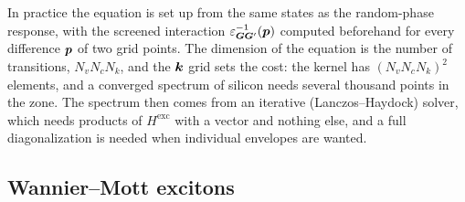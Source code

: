 In practice the equation is set up from the same states as the random-phase response, with the screened interaction $\varepsilon^{-1}_{\bm{G}\bm{G}'}(\bm{p})$ computed beforehand for every difference $\bm{p}$ of two grid points. The dimension of the equation is the number of transitions, $N_vN_cN_k$, and the $\bm{k}$ grid sets the cost: the kernel has $(N_vN_cN_k)^2$ elements, and a converged spectrum of silicon needs several thousand points in the zone. The spectrum then comes from an iterative (Lanczos--Haydock) solver, which needs products of $H^{\mathrm{exc}}$ with a vector and nothing else, and a full diagonalization is needed when individual envelopes are wanted.

\subsection{Wannier--Mott excitons}

